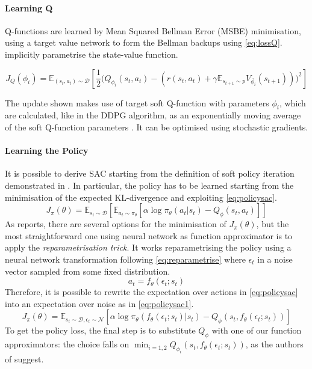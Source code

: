 \paragraph{Learning Q} Q-functions are learned by Mean Squared Bellman Error (MSBE) minimisation, using a target value network to form the Bellman backups using \vref{eq:lossQ}.
 implicitly parametrise the state-value function.

\begin{equation} \label{eq:lossQ}
	J_Q(\phi_i) = \mathbb{E}_{(s_t,a_t) \sim \mathcal D}\left[ \frac{1}{2}\Bigg( Q_{\phi_i}(s_t,a_t) - \left(r(s_t, a_t) + \gamma \mathbb{E}_{s_{t+1} \sim p} V_{\bar{\phi_i}}(s_{t+1}) \right) \Bigg)^2 \right]
\end{equation}


The update shown makes use of target soft Q-function with parameters $\phi_i$, which are calculated, like in the DDPG algorithm, as an exponentially moving average of the soft Q-function parameters \cite{mnih2015human}.
It can be optimised using stochastic gradients.

\paragraph{Learning the Policy} It is possible to derive SAC starting from the definition of soft policy iteration demonstrated in   \cite[Section 4]{haarnoja2018alg}.
In particular, the policy has to be learned starting from the minimisation of the expected KL-divergence \cite{kullback1959information,kullback1951information} and exploiting \vref{eq:policysac}.
\begin{equation} \label{eq:policysac}
	J_\pi(\theta) = \mathbb{E}_{s_t \sim \mathcal{D}}[\mathbb{E}_{a_t \sim \pi_\theta}[\alpha \log \pi_\theta(a_t|s_t) - Q_\phi(s_t,a_t)]]
\end{equation}
As \cite{haarnoja2018alg} reports, there are several options for the minimisation of $J_\pi(\theta)$, but the most straightforward one using neural network as function approximator is to apply the \textit{reparametrisation trick}.
It works reparametrising the policy using a neural network transformation following \vref{eq:reparametrise} where $\epsilon_t$ in a noise vector sampled from some fixed distribution.
\begin{equation} \label{eq:reparametrise}
	a_t = f_\theta(\epsilon_t; s_t)
\end{equation}
Therefore, it is possible to rewrite the expectation over actions in \vref{eq:policysac} into an expectation over noise as in \vref{eq:policysac1}.
\begin{equation} \label{eq:policysac1}
	J_\pi(\theta) = \mathbb{E}_{s_t \sim \mathcal{D}, \epsilon_t \sim \mathcal{N}}[\alpha \log \pi_\theta(f_\theta(\epsilon_t; s_t)|s_t) - Q_\phi(s_t,f_\theta(\epsilon_t; s_t))]
\end{equation}
To get the policy loss, the final step is to substitute $Q_{\phi}$ with one of our function approximators: the choice falls on $\min_{i=1,2}Q_{\phi_i}(s_t, f_\theta(\epsilon_t; s_t))$, as the authors of \cite{haarnoja2018alg} suggest.

